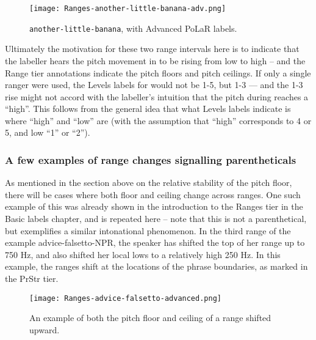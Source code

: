 \begin{figure}[H]
\centering
%
\texttt{[image: Ranges-another-little-banana-adv.png]}
%
\caption{\texttt{another-little-banana}, with Advanced PoLaR labels.%
\label{fig:another-little-banana Ranges Adv}%
}
\end{figure}

Ultimately the motivation for these two range intervals here is to indicate that the labeller hears the pitch movement in  to be rising from low to high – and the Range tier annotations indicate the pitch floors and pitch ceilings. If only a single ranger were used, the Levels labels for  would not be 1-5, but 1-3 — and the 1-3 rise might not accord with the labeller’s intuition that the pitch during  reaches a “high”. This follows from the general idea that what Levels labels indicate is where “high” and “low” are (with the assumption that “high” corresponds to 4 or 5, and low “1” or “2”).

\subsubsection{A few examples of range changes signalling parentheticals }\label{sec:a-few-examples-of-range-changes-signalling-parentheticals}

As mentioned in the section above on the relative stability of the pitch floor, there will be cases where both floor and ceiling change across ranges. One such example of this was already shown in the introduction to the Ranges tier in the Basic labels chapter, and is repeated here – note that this is not a parenthetical, but exemplifies a similar intonational phenomenon. In the third range of the example advice-falsetto-NPR, the speaker has shifted the top of her range up to 750 Hz, and also shifted her local lows to a relatively high 250 Hz. In this example, the ranges shift at the locations of the phrase boundaries, as marked in the PrStr tier.

\begin{figure}[H]
\centering
%
\texttt{[image: Ranges-advice-falsetto-advanced.png]}
%
\caption{An example of both the pitch floor and ceiling of a range shifted upward.%
\label{fig:advice-falsetto Ranges Adv}%
}
\end{figure}

